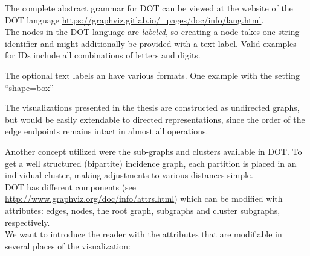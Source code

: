 \documentclass[a4paper, 12pt, bibliography=totoc]{scrartcl}
\begin{document}


The complete abstract grammar for DOT can be viewed at the website of the DOT language \url{https://graphviz.gitlab.io/_pages/doc/info/lang.html}.\\


The nodes in the DOT-language are \emph{labeled}, so creating a node takes one string identifier and might additionally be provided with a text label. Valid examples for IDs include all combinations of letters and digits.

The optional text labels an have various formats. One example with the setting ``shape=box''

The visualizations presented in the thesis are constructed as undirected graphs, but would be easily extendable to directed representations, since the order of the edge endpoints remains intact in almost all operations.

Another concept utilized were the sub-graphs and clusters available in DOT.
To get a well structured (bipartite) incidence graph, each partition is placed in an individual cluster, making adjustments to various distances simple.\\


DOT has different components (see \url{http://www.graphviz.org/doc/info/attrs.html}) which can be modified with attributes: edges, nodes, the root graph, subgraphs and cluster subgraphs, respectively.\\


We want to introduce the reader with the attributes that are modifiable in several places of the visualization:
\end{document}
